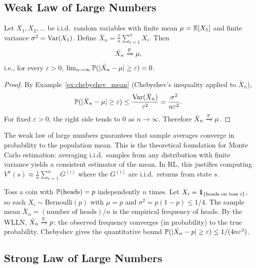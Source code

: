 \documentclass[11pt,a4paper]{article}
\begin{document}
\subsection{Weak Law of Large Numbers}

\begin{theorem}
\label{thm:wlln}
Let $X_1, X_2, \ldots$ be i.i.d.\ random variables with finite mean
$\mu = \mathbb{E}[X_1]$ and finite variance $\sigma^2 = \operatorname{Var}(X_1)$. Define
$\bar{X}_n = \frac{1}{n}\sum_{i=1}^n X_i$. Then
\[
    \bar{X}_n \xrightarrow{\mathbb{P}} \mu,
\]
i.e., for every $\varepsilon > 0$,
$\lim_{n \to \infty} \mathbb{P}(|\bar{X}_n - \mu| \geq \varepsilon) = 0$.
\end{theorem}

\begin{proof}
By Example~\ref{ex:chebyshev_mean} (Chebyshev's inequality applied
to $\bar{X}_n$),
\[
    \mathbb{P}(|\bar{X}_n - \mu| \geq \varepsilon)
    \leq \frac{\operatorname{Var}(\bar{X}_n)}{\varepsilon^2}
    = \frac{\sigma^2}{n\varepsilon^2}.
\]
For fixed $\varepsilon > 0$, the right side tends to $0$ as
$n \to \infty$. Therefore $\bar{X}_n \xrightarrow{\mathbb{P}} \mu$.
\end{proof}

\begin{keyresult}[title={The Law of Large Numbers}]
The weak law of large numbers guarantees that sample averages
converge in probability to the population mean. This is the
theoretical foundation for Monte Carlo estimation: averaging
i.i.d.\ samples from any distribution with finite variance yields
a consistent estimator of the mean. In RL, this justifies computing
$V^\pi(s) \approx \frac{1}{n}\sum_{i=1}^n G^{(i)}$ where the
$G^{(i)}$ are i.i.d.\ returns from state $s$.
\end{keyresult}

\begin{example}
\label{ex:wlln_coin}
Toss a coin with $\mathbb{P}(\text{heads}) = p$ independently $n$ times.
Let $X_i = \mathbf{1}_{\{\text{heads on toss } i\}}$, so each
$X_i \sim \mathrm{Bernoulli}(p)$ with $\mu = p$ and
$\sigma^2 = p(1-p) \leq 1/4$. The sample mean
$\bar{X}_n = (\text{number of heads})/n$ is the empirical frequency
of heads. By the WLLN, $\bar{X}_n \xrightarrow{\mathbb{P}} p$: the observed
frequency converges (in probability) to the true probability.
Chebyshev gives the quantitative bound
$\mathbb{P}(|\bar{X}_n - p| \geq \varepsilon) \leq 1/(4n\varepsilon^2)$.
\end{example}

\subsection{Strong Law of Large Numbers}
\end{document}
